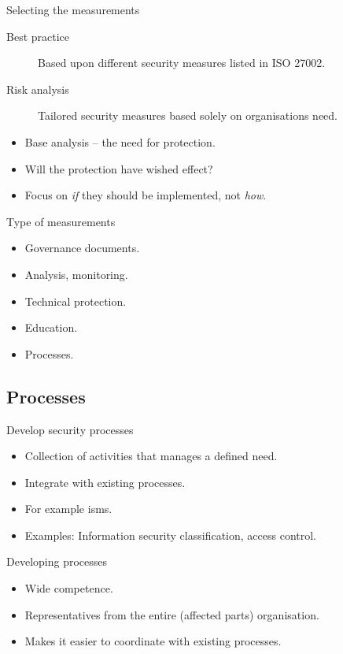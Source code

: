 \documentclass{beamer}
\begin{document}
\begin{frame}{Selecting the measurements}
  \begin{description}
    \item[Best practice] Based upon different security measures listed in ISO
      27002.
    \item[Risk analysis] Tailored security measures based solely on
      organisations need.
  \end{description}
  \begin{itemize}
    \item Base analysis -- the need for protection.
    \item Will the protection have wished effect?
    \item Focus on \emph{if} they should be implemented, not \emph{how}.
  \end{itemize}
\end{frame}
\begin{frame}{Type of measurements}
  \begin{itemize}
    \item Governance documents.
    \item Analysis, monitoring.
    \item Technical protection.
    \item Education.
    \item Processes.
  \end{itemize}
\end{frame}

\subsection{Processes}
\begin{frame}{Develop security processes}
  \begin{itemize}
    \item Collection of activities that manages a defined need.
    \item Integrate with existing processes.
    \item For example \ac{isms}.
    \item Examples: Information security classification, access control.
  \end{itemize}
\end{frame}
\begin{frame}{Developing processes}
  \begin{itemize}
    \item Wide competence.
    \item Representatives from the entire (affected parts) organisation.
    \item Makes it easier to coordinate with existing processes.
  \end{itemize}
\end{frame}
\end{document}
